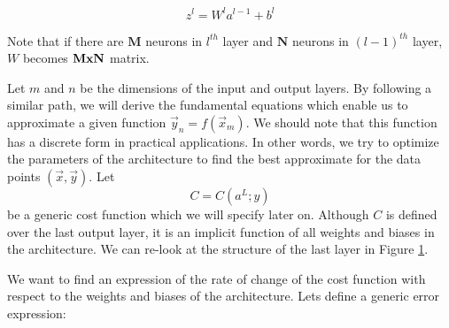 \documentclass[12pt]{article}
\begin{document}
\begin{equation}
z^{l} = W^{l}a^{l-1}+b^{l}  
\end{equation}

Note that if there are $\bm{M}$ neurons in $l^{th}$ layer and  $\bm{N}$ neurons in $(l-1)^{th}$ layer, $W$ becomes 
$\bf{MxN}$ matrix. 

Let $m$ and $n$ be the dimensions of the input and output layers. By following a similar path, we will derive the fundamental equations which enable us to approximate a given function $\vec{y}_{n}=f(\vec{x}_{m})$. We should note that this function has a discrete form in practical applications. In other words, we try to optimize the parameters of the architecture to find the best approximate for the data points $(\vec{x},\vec{y})$. Let 
\begin{equation}
C=C(a^{L};y)
\end{equation}
be a generic cost function which we will specify later on. Although $C$ is defined over the last output layer, it is an implicit function of all weights and biases in the architecture. We can re-look at the structure of the last layer in Figure \ref{fig:output}.


\begin{figure}[H]
  \centering
  \label{fig:output}
\end{figure}


We want to find an expression of the rate of change of the cost function with respect to the weights and biases of the architecture. Lets define a generic error expression: 
\end{document}
